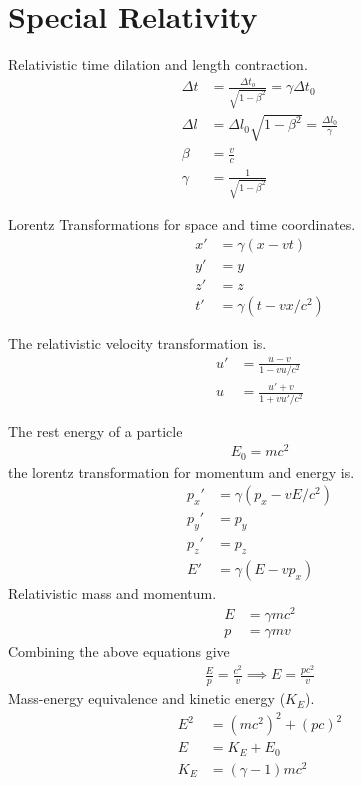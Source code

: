 \chapter{Special Relativity}
\thispagestyle{fancy}
\begin{multicols}{2}
Relativistic time dilation and length contraction.
\begin{align}
\Delta t &= \frac{\Delta t_o}{\sqrt{1-\beta^2}} = \gamma \Delta t_0 \\
\Delta l &= \Delta l_0 \sqrt{1 - \beta^2} = \frac{\Delta l_0}{\gamma} \\
\beta &= \frac{v}{c} \\
\gamma &= \frac{1}{\sqrt{1-\beta^2}}
\end{align}

Lorentz Transformations for space and time coordinates.
\begin{align}
x'&= \gamma(x-vt) \\
y'&=y \\
z' &= z \\
t'&= \gamma (t-vx/c^2)
\end{align}

The relativistic velocity transformation is.
\begin{align}
u' &= \frac{u-v}{1-vu/c^2} \\
u &= \frac{u'+v}{1+vu'/c^2}
\end{align}

The rest energy of a particle
\begin{align}
E_0=mc^2
\end{align}
the lorentz transformation for momentum and energy is.
\begin{align}
p_x' &= \gamma(p_x-vE/c^2) \\
p_y' &= p_y \\
p_z' &= p_z \\
E' &= \gamma(E-vp_x)
\end{align}
Relativistic mass and momentum.
\begin{align}
E &=\gamma mc^2 \\
p &= \gamma mv
\end{align}
Combining the above equations give 
\begin{align}
\frac{E}{p} = \frac{c^2}{v} \implies E=\frac{pc^2}{v}
\end{align}
Mass-energy equivalence and kinetic energy ($K_E$).
\begin{align}
E^2 &=(mc^2)^2 + (pc)^2 \\
E &= K_E + E_0 \\
K_E &= (\gamma - 1)mc^2 
\end{align}


\end{multicols}
